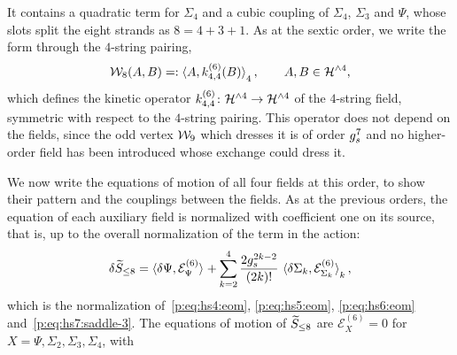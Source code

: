 It contains a quadratic term for $\Sigma_4$ and a cubic coupling of $\Sigma_4$, $\Sigma_3$ and $\Psi$, whose slots split the eight strands as $8 = 4 + 3 + 1$.
As at the sextic order, we write the form through the $4$-string pairing,
\begin{equation}
  \label{p:eq:hs8:kinetic}
  \dvertex{8}(A, B)
    =: \pair[4]{A}{\kin{4}{}{6}(B)},
  \qquad
  A, B \in \Hn{4},
\end{equation}
which defines the kinetic operator $\kin{4}{}{6} \colon \Hn{4} \to \Hn{4}$ of the $4$-string field, symmetric with respect to the $4$-string pairing.
This operator does not depend on the fields, since the odd vertex $\dvertex{9}$ which dresses it is of order $\gs^7$ and no higher-order field has been introduced whose exchange could dress it.

We now write the equations of motion of all four fields at this order, to show their pattern and the couplings between the fields.
  As at the previous orders, the equation of each auxiliary field is normalized with coefficient one on its source, that is, up to the overall normalization of the term in the action:
  \begin{equation}
  \label{p:eq:hs8:eom-normalization}
  \delta \caction[\le 8]
    = \pair{\delta \Psi}{\mathcal E^{(6)}_\Psi}
      + \sum_{k = 2}^{4} \frac{2 \gs^{2 k - 2}}{(2 k)!} \, \pair[k]{\delta \Sigma_k}{\mathcal E^{(6)}_{\Sigma_k}},
\end{equation}
  which is the normalization of~\eqref{p:eq:hs4:eom}, \eqref{p:eq:hs5:eom}, \eqref{p:eq:hs6:eom} and~\eqref{p:eq:hs7:saddle-3}.
  The equations of motion of $\caction[\le 8]$ are $\mathcal E^{(6)}_X = 0$ for $X = \Psi, \Sigma_2, \Sigma_3, \Sigma_4$, with
